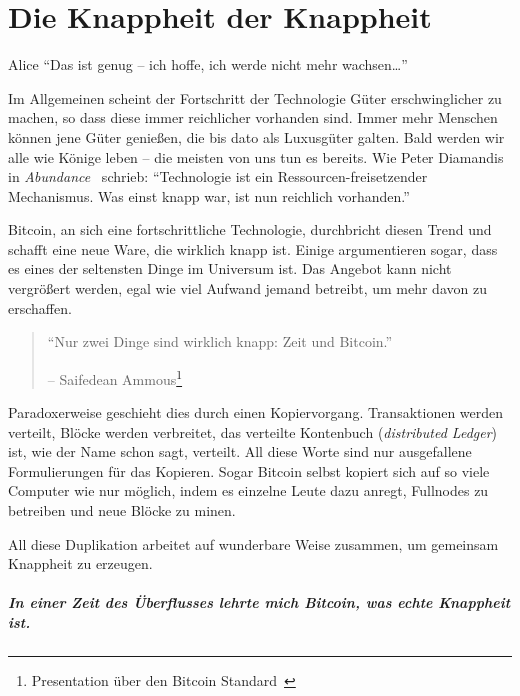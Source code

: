\chapter{Die Knappheit der Knappheit}
\label{les:2}

\begin{chapquote}{Alice}
\enquote{Das ist genug – ich hoffe, ich werde nicht mehr wachsen\ldots}
\end{chapquote}

Im Allgemeinen scheint der Fortschritt der Technologie Güter erschwinglicher zu
machen, so dass diese immer reichlicher vorhanden sind. Immer mehr Menschen
können jene Güter genießen, die bis dato als Luxusgüter galten. Bald werden wir
alle wie Könige leben -- die meisten von uns tun es bereits. Wie Peter Diamandis
in \textit{Abundance}~\cite{abundance} schrieb: \enquote{Technologie ist ein
Ressourcen-freisetzender Mechanismus. Was einst knapp war, ist nun reichlich
vorhanden.}

Bitcoin, an sich eine fortschrittliche Technologie, durchbricht diesen Trend und
schafft eine neue Ware, die wirklich knapp ist. Einige argumentieren sogar, dass
es eines der seltensten Dinge im Universum ist. Das Angebot kann nicht
vergrößert werden, egal wie viel Aufwand jemand betreibt, um mehr davon zu
erschaffen.

\begin{quotation}\begin{samepage}
\enquote{Nur zwei Dinge sind wirklich knapp: Zeit und Bitcoin.}
\begin{flushright} -- Saifedean Ammous\footnote{Presentation über den Bitcoin
Standard~\cite{bitcoinstandard-pres}}
\end{flushright}\end{samepage}\end{quotation}

Paradoxerweise geschieht dies durch einen Kopiervorgang. Transaktionen werden
verteilt, Blöcke werden verbreitet, das verteilte Kontenbuch
(\textit{distributed Ledger}) ist, wie der Name schon sagt, verteilt. All diese
Worte sind nur ausgefallene Formulierungen für das Kopieren. Sogar Bitcoin
selbst kopiert sich auf so viele Computer wie nur möglich, indem es einzelne
Leute dazu anregt, Fullnodes zu betreiben und neue Blöcke zu minen.

All diese Duplikation arbeitet auf wunderbare Weise zusammen, um gemeinsam
Knappheit zu erzeugen.

\paragraph{In einer Zeit des Überflusses lehrte mich Bitcoin, was echte
Knappheit ist.}

